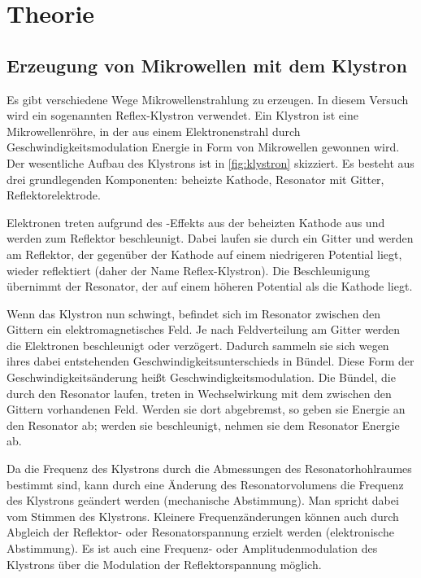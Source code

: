 
\section{Theorie}

\subsection{Erzeugung von Mikrowellen mit dem Klystron}

Es gibt verschiedene Wege Mikrowellenstrahlung zu erzeugen.  In diesem
Versuch wird ein sogenannten Reflex-Klystron verwendet.  Ein Klystron
ist eine Mikrowellenröhre, in der aus einem Elektronenstrahl durch
Geschwindigkeitsmodulation Energie in Form von Mikrowellen gewonnen
wird.  Der wesentliche Aufbau des Klystrons ist in \cref{fig:klystron}
skizziert.  Es besteht aus drei grundlegenden Komponenten: beheizte
Kathode, Resonator mit Gitter, Reflektorelektrode.

Elektronen treten aufgrund des -Effekts aus der beheizten
Kathode aus und werden zum Reflektor beschleunigt. Dabei laufen sie
durch ein Gitter und werden am Reflektor, der gegenüber der Kathode auf
einem niedrigeren Potential liegt, wieder reflektiert (daher der Name
Reflex-Klystron).  Die Beschleunigung übernimmt der Resonator, der auf
einem höheren Potential als die Kathode liegt.

Wenn das Klystron nun schwingt, befindet sich im Resonator zwischen den
Gittern ein elektromagnetisches Feld.  Je nach Feldverteilung am Gitter
werden die Elektronen beschleunigt oder verzögert.  Dadurch sammeln sie
sich wegen ihres dabei entstehenden Geschwindigkeitsunterschieds in
Bündel.  Diese Form der Geschwindigkeitsänderung heißt
Geschwindigkeitsmodulation.  Die Bündel, die durch den Resonator laufen,
treten in Wechselwirkung mit dem zwischen den Gittern vorhandenen Feld.
Werden sie dort abgebremst, so geben sie Energie an den Resonator ab;
werden sie beschleunigt, nehmen sie dem Resonator Energie ab.

Da die Frequenz des Klystrons durch die Abmessungen des
Resonatorhohlraumes bestimmt sind, kann durch eine Änderung des
Resonatorvolumens die Frequenz des Klystrons geändert werden
(mechanische Abstimmung).  Man spricht dabei vom Stimmen des Klystrons.
Kleinere Frequenzänderungen können auch durch Abgleich der Reflektor-
oder Resonatorspannung erzielt werden (elektronische Abstimmung).  Es
ist auch eine Frequenz- oder Amplitudenmodulation des Klystrons über die
Modulation der Reflektorspannung möglich.


